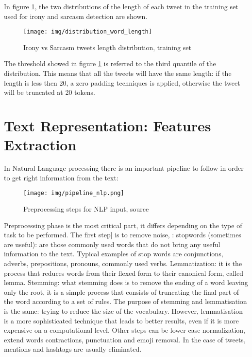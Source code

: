 \newpage\noindent In figure \ref{fig:tokendistrib}, the two distributions of the length of each tweet in the training set used for irony and sarcasm detection are shown.  

\begin{figure}[H]
	\centering
	\texttt{[image: img/distribution\_word\_length]}
	\caption{Irony vs Sarcasm tweets length distribution, training set}\label{fig:tokendistrib}
\end{figure}

\noindent The threshold showed in figure \ref{fig:tokendistrib} is referred to the third quantile of the distribution. This means that all the tweets will have the same length: if the length is less then 20, a zero padding techniques is applied, otherwise the tweet will be truncated at 20 tokens.

\newpage\section{Text Representation: Features Extraction}
In Natural Language processing there is an important pipeline to follow in order to get right information from the text: 
 \begin{figure}[H]
 	\centering
 	\texttt{[image: img/pipeline\_nlp.png]}
 	\caption{Preprocessing steps for NLP input, source \cite{pipelineNLP}}\label{fig:nlpipeline}
 \end{figure}

Preprocessing phase is the most critical part, it differs depending on the type of task to be performed. The first step] is to remove noise, : stopwords (sometimes are useful): are those commonly used words that do not bring any useful information to the text. Typical examples of stop words are conjunctions, adverbs, prepositions, pronouns, commonly used verbs. 
Lemmatization: it is the process that reduces words from their flexed form to their canonical form, called lemma. Stemming: what stemming does is to remove the ending of a word leaving only the root, it is a simple process that consists of truncating the final part of the word according to a set of rules. The purpose of stemming and lemmatisation is the same: trying to reduce the size of the vocabulary. However, lemmatisation is a more sophisticated technique that leads to better results, even if it is more expensive on a computational level. Other steps can be lower case normalization, extend words contractions, punctuation and emoji removal. In the case of tweets, mentions and hashtags are usually eliminated. 

